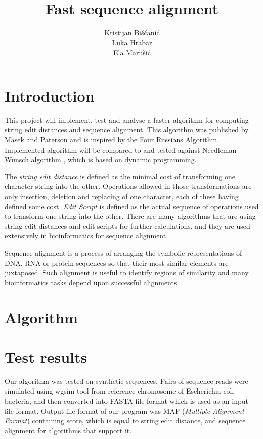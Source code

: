 \documentclass[times, utf8, seminar, numeric]{fer}
\begin{document}
\title{Fast sequence alignment}

\author{Kristijan Biščanić \\ Luka Hrabar \\ Ela Marušić}

\maketitle

\tableofcontents

\chapter{Introduction}
This project will implement, test and analyse a faster algorithm for computing string edit distances and sequence alignment. This algorithm was published by Masek and Paterson \cite{masek1980faster} and is inspired by the Four Russians Algorithm. Implemented algorithm will be compared to and tested against Needleman-Wunsch algorithm \cite{needleman1970general}, which is based on dynamic programming.

The \textit{string edit distance} is defined as the minimal cost of transforming one character string into the other. Operations allowed in those transformations are only insertion, deletion and replacing of one character, each of these having defined some cost. \textit{Edit Script} is defined as the actual sequence of operations used to transform one string into the other. There are many algorithms that are using string edit distances and edit scripts for further calculations, and they are used extensively in bioinformatics for sequence alignment.

Sequence alignment is a process of arranging the symbolic representations of DNA, RNA or protein sequences so that their most similar elements are juxtaposed. Such alignment is useful to identify regions of similarity and many bioinformatics tasks depend upon successful alignments.

\chapter{Algorithm}

\chapter{Test results}
Our algorithm was tested on synthetic sequences. Pairs of sequence reads were simulated using wgsim tool from reference chromosome of Escherichia coli bacteria, and then converted into FASTA file format which is used as an input file format. Output file format of our program was MAF (\textit{Multiple Alignment Format}) containing score, which is equal to string edit distance, and sequence alignment for algorithms that support it. 
\end{document}
